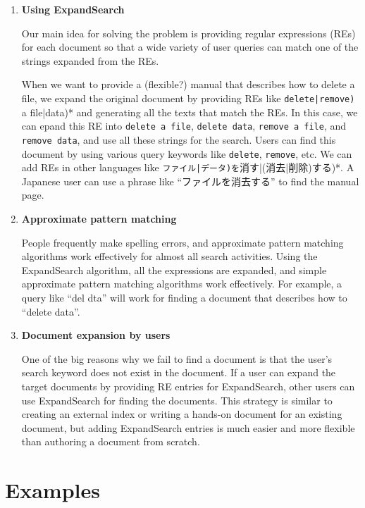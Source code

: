 \documentclass[manuscript,screen,review]{acmart}
\def\ES{\textsf{ExpandSearch}}
\begin{document}
\begin{enumerate}
  
\item \textbf{Using ExpandSearch}
  
  Our main idea for solving the problem is 
  providing regular expressions (REs)
  for  each document so that a wide variety of user queries can match one of the
  strings expanded from the REs.
  
  When we want to provide a (flexible?) manual that describes how to delete a file,
  we expand the original document by
  providing REs like \verb*(delete|remove) (a file|data)*
  and generating all the texts that match the REs.
  In this case, we can epand this RE into
  \verb|delete a file|,
  \verb|delete data|,
  \verb|remove a file|, and
  \verb|remove data|,
  and use all these strings for the search.
  Users can find this document by using various query keywords like
  \verb|delete|, \verb|remove|, etc.
  We can add REs in other languages
  like \verb*(ファイル|データ)を(消す|(消去|削除)する)*.
  A Japanese user can use a phrase like ``ファイルを消去する'' to find the manual page.

\item \textbf{Approximate pattern matching}

  People frequently make spelling errors,
  and approximate pattern matching algorithms
  work effectively for almost all search activities.
  Using the {\ES} algorithm, all the expressions are expanded,
  and simple approximate pattern matching algorithms work effectively.
  For example, a query like ``del dta'' will work for
  finding a document that describes how to ``delete data''.

\item \textbf{Document expansion by users}

  One of the big reasons why we fail to find a document is that
  the user's search keyword does not exist in the document.
  If a user can expand the target documents by
  providing RE entries for {\ES},
  other users can use {\ES} for finding the documents.
  This strategy is similar to creating an external index or
  writing a hands-on document for an existing document,
  but adding {\ES} entries is much easier and more flexible than
  authoring a document from scratch.

\end{enumerate}

\section{Examples}
\end{document}

